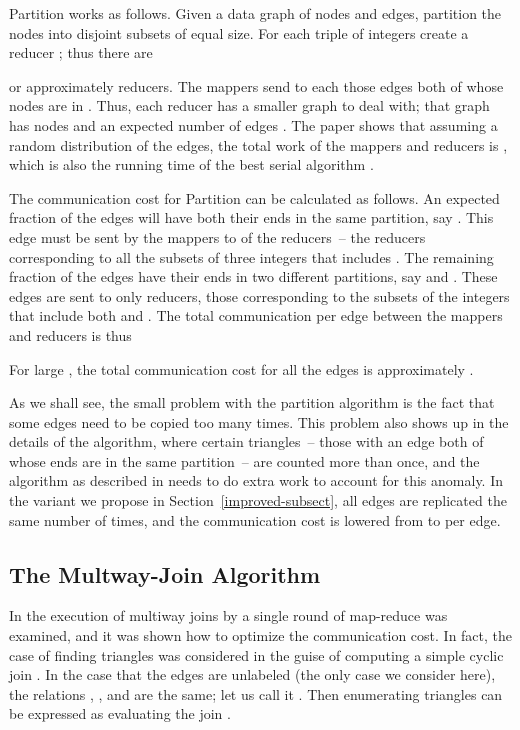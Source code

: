 Partition works as follows.
Given a data graph of  nodes and  edges, partition the  nodes into  disjoint subsets  of equal size.  For each triple of integers  create a reducer ; thus there are

or approximately  reducers.  The mappers send to each  those edges both of whose nodes are in .  Thus, each reducer has a smaller graph to deal with; that graph has  nodes and an expected number of edges .  The paper \cite{SV11} shows that assuming a random distribution of the edges, the total work of the mappers and reducers is , which is also the running time of the best serial algorithm \cite{Schank07}.

The communication cost for Partition can be calculated as fol\-lows.  An expected fraction  of the edges will have both their ends in the same partition, say .  This edge must be sent by the mappers to  of the reducers~-- the reducers corresponding to all the subsets of three integers that includes .  The remaining fraction  of the edges have their ends in two different partitions, say  and .  These edges are sent to only  reducers, those corresponding to the subsets of the integers that include both  and .
The total communication per edge between the mappers and reducers is thus

For large , the total communication cost for all the edges is approximately .

As we shall see, the small problem with the partition algorithm is the fact that some edges need to be copied too many times.  This problem also shows up in the details of the algorithm, where certain triangles~-- those with an edge both of whose ends are in the same partition~-- are counted more than once, and the algorithm as described in \cite{SV11} needs to do extra work to account for this anomaly.  In the variant we propose in Section~\ref{improved-subsect}, all edges are replicated the same number of times, and the communication cost is lowered from  to  per edge.

\subsection{The Multway-Join Algorithm}
\label{mj-subsect}

In \cite{AU10} the execution of multiway joins by a single round of map-reduce was examined, and it was shown how to optimize the communication cost.  In fact, the case of finding triangles was considered in the guise of computing a simple cyclic join .  In the case that the edges are unlabeled (the only case we consider here), the relations , , and  are the same; let us call it .  Then enumerating triangles can be expressed as evaluating the join
.

